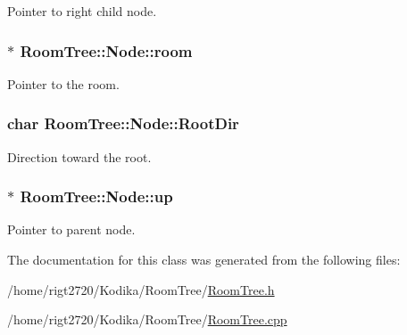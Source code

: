 Pointer to right child node. 

\hypertarget{classRoomTree_1_1Node_a4f39bdd1110291bf2e6eb14469f9b1e3}{
\subsubsection[{room}]{$\ast$ Room\-Tree\-::\-Node\-::room}}\label{classRoomTree_1_1Node_a4f39bdd1110291bf2e6eb14469f9b1e3}


Pointer to the room. 

\hypertarget{classRoomTree_1_1Node_a3e006530059cc6994534d92e10b5fc72}{
\subsubsection[{Root\-Dir}]{\setlength{\rightskip}{0pt plus 5cm}char Room\-Tree\-::\-Node\-::\-Root\-Dir}}\label{classRoomTree_1_1Node_a3e006530059cc6994534d92e10b5fc72}


Direction toward the root. 

\hypertarget{classRoomTree_1_1Node_a24e82297cf3fe584fbca68f790c51abf}{
\subsubsection[{up}]{$\ast$ Room\-Tree\-::\-Node\-::up}}\label{classRoomTree_1_1Node_a24e82297cf3fe584fbca68f790c51abf}


Pointer to parent node. 



The documentation for this class was generated from the following files\-:\begin{DoxyCompactItemize}
\item 
/home/rigt2720/\-Kodika/\-Room\-Tree/\hyperlink{RoomTree_8h}{Room\-Tree.\-h}\item 
/home/rigt2720/\-Kodika/\-Room\-Tree/\hyperlink{RoomTree_8cpp}{Room\-Tree.\-cpp}\end{DoxyCompactItemize}
